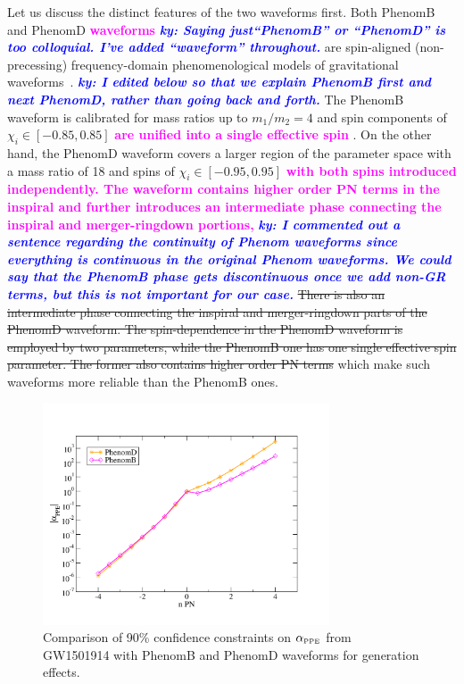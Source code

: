 \documentclass[prd,twocolumn,nofootinbib]{revtex4-1}
\newcommand{\PPE}{{\mbox{\tiny PPE}}}
\newcommand{\ky}[1]{\textcolor{blue}{\it{\textbf{ky: #1}}} }
\newcommand{\kent}[1]{\textcolor{magenta}{\textbf{#1}} }
\begin{document}
Let us discuss the distinct features of the two waveforms first. Both PhenomB and PhenomD \kent{waveforms} \ky{Saying just``PhenomB'' or ``PhenomD'' is too colloquial. I've added ``waveform'' throughout.} are spin-aligned (non-precessing) frequency-domain phenomenological models of gravitational waveforms~\cite{Ajith:2009bn,Khan:2015jqa}. 
\ky{I edited below so that we explain PhenomB first and next PhenomD, rather than going back and forth.}
The PhenomB waveform is calibrated for mass ratios up to $m_1/m_2 = 4$ and spin components of $\chi_i\in[-0.85,0.85]$ \kent{are unified into a single effective spin}. On the other hand, the PhenomD waveform covers a larger region of the parameter space with a mass ratio of 18 and spins of $\chi_i\in[-0.95,0.95]$ \kent{with both spins introduced independently. The waveform  contains higher order PN terms in the inspiral and further introduces an intermediate phase connecting the inspiral and merger-ringdown portions,} 
\ky{I commented out a sentence regarding the continuity of Phenom waveforms since everything is continuous in the original Phenom waveforms. We could say that the PhenomB phase gets discontinuous once we add non-GR terms, but this is not important for our case.}
\sout{There is also an intermediate phase connecting the inspiral and merger-ringdown parts of the PhenomD waveform. The spin-dependence in the PhenomD waveform is employed by two parameters, while the PhenomB  one has one single effective spin parameter. The former also contains higher order PN terms}
which make such waveforms more reliable than the PhenomB ones.

\begin{figure}[htb]
\includegraphics[width=8.5cm]{phenomBvsphenomD.pdf}
\caption{Comparison of 90\% confidence constraints on $\alpha_{\PPE}$ from GW1501914 with PhenomB and PhenomD waveforms for generation effects. }
\label{fig:phenomBvsD}
\end{figure}
\end{document}
